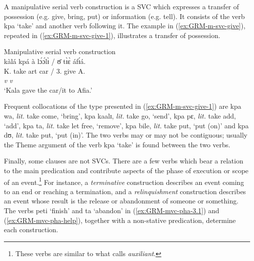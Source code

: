 \ea\label{ex:GRM-mvc-3-4}



\z 
 \z

 
A  manipulative serial verb construction \citep[378]{Amek06} is a SVC
which  expresses a transfer of possession (e.g. give, bring, put)  or  
information (e.g. tell). It consists of the verb {\sls kpa} `take' and another
verb following it. The example in (\ref{ex:GRM-m-svc-give}), repeated in 
(\ref{ex:GRM-m-svc-give-1}), 
illustrates a transfer of possession. 

\newpage 
\begin{exe}

\ex\label{ex:GRM-m-svc-give-1}{\rm Manipulative serial verb construction}\\
\glll  kàlá kpá  {à lɔ́ɔ́lɪ̀ / ʊ̄} tɪ̀ɛ̀ áfɪ́á.\\
K. take  {{\sc art} car / 3.\sg} give A.\\
{} {\it v} {}  {\it v} {}\\
\glt  `Kala gave the car/it to Afia.'
 
\end{exe}

Frequent collocations of the type presented in (\ref{ex:GRM-m-svc-give-1}) are {\sls kpa wa}, {\it lit.}  take come,  `bring',  {\sls kpa kaalɪ}, {\it lit.} take go, `send', {\sls kpa pɛ}, {\it lit.} take add,  `add', {\sls kpa ta}, {\it lit.} take let free, `remove', {\sls kpa bile}, {\it lit.} take put,  `put (on)'  and {\sls kpa dʊ}, {\it lit.} take put,  `put (in)'. The two verbs may or may not be contiguous;  usually the Theme argument of the  verb {\sls kpa} `take'  is found between the two verbs.


Finally, some  clauses are not  SVCs.  There are a few verbs which bear a relation to the main predication and  contribute  aspects of the phase of execution or scope of an event.\footnote{These verbs are similar to what \citet[108]{Bonv88} calls {\it auxiliant}.} For instance, a {\it terminative}  construction describes an event coming to an end or reaching a termination, and  a {\it relinquishment} construction describes an event whose result is the release or abandonment of someone or something.  The verbs {\sls peti} `finish' and {\sls ta} `abandon' in (\ref{ex:GRM-mvc-pha-3.1}) and (\ref{ex:GRM-mvc-pha-help}), together with a non-stative predication, determine each construction. 

